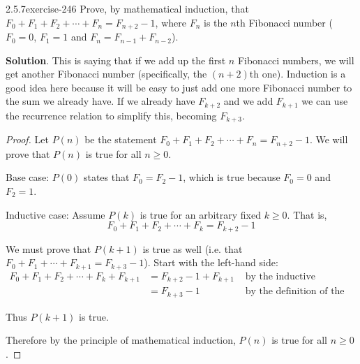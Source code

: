 \documentclass[twoside,11pt,]{book}
\numberwithin{equation}{chapter}
\newcommand{\amp}{&}
\begin{document}
\begin{divisionsolution}{2.5.7}{}{exercise-246}%
\hypertarget{p-3601}{}%
Prove, by mathematical induction, that \(F_0 + F_1 + F_2 + \cdots + F_{n} = F_{n+2} - 1\), where \(F_n\) is the \(n\)th Fibonacci number (\(F_0 = 0\), \(F_1 = 1\) and \(F_n = F_{n-1} + F_{n-2}\)).%
\par\smallskip%
\noindent\textbf{Solution}.\quad%
\hypertarget{p-3602}{}%
This is saying that if we add up the first \(n\) Fibonacci numbers, we will get another Fibonacci number (specifically, the \((n+2)\)th one). Induction is a good idea here because it will be easy to just add one more Fibonacci number to the sum we already have. If we already have \(F_{k+2}\) and we add \(F_{k+1}\) we can use the recurrence relation to simplify this, becoming \(F_{k+3}\).%
\begin{proof}{}
\hypertarget{p-3603}{}%
Let \(P(n)\) be the statement \(F_0 + F_1 + F_2 + \cdots + F_n = F_{n+2} - 1\). We will prove that \(P(n)\) is true for all \(n \ge 0\).%
\par
\hypertarget{p-3604}{}%
Base case: \(P(0)\) states that \(F_0 = F_2 - 1\), which is true because \(F_0 = 0\) and \(F_2 = 1\).%
\par
\hypertarget{p-3605}{}%
Inductive case: Assume \(P(k)\) is true for an arbitrary fixed \(k \ge 0\). That is,%
\begin{equation*}
F_0 + F_1 + F_2 + \cdots + F_k = F_{k+2} - 1
\end{equation*}
%
\par
\hypertarget{p-3606}{}%
We must prove that \(P(k+1)\) is true as well (i.e. that \(F_0 + F_1 + \cdots +F_{k+1} = F_{k+3} - 1\)). Start with the left-hand side:%
\begin{align*}
F_0 + F_1 + F_2 + \cdots + F_k + F_{k+1} \amp = F_{k+2} - 1 + F_{k+1} \amp \mbox{ by the inductive hypothesis}\\
\amp = F_{k+3} - 1 \amp \mbox{ by the definition of the Fibonacci numbers}
\end{align*}
%
\par
\hypertarget{p-3607}{}%
Thus \(P(k+1)\) is true.%
\par
\hypertarget{p-3608}{}%
Therefore by the principle of mathematical induction, \(P(n)\) is true for all \(n \ge 0\).%
\end{proof}
\end{divisionsolution}%
\end{document}
